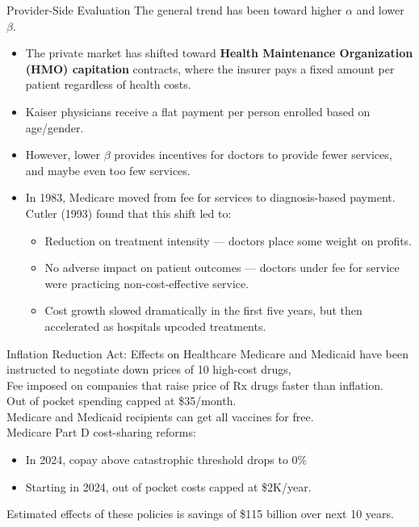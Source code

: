 \documentclass[10pt]{extarticle}
\begin{document}
\begin{problem}{Provider-Side Evaluation}
    The general trend has been toward higher $\alpha$ and lower $\beta$.
    \begin{itemize}
      \item The private market has shifted toward \textbf{Health Maintenance Organization (HMO) capitation} contracts, where the insurer pays a fixed amount per patient regardless of health costs.
      \item Kaiser physicians receive a flat payment per person enrolled based on age/gender.
      \item However, lower $\beta$ provides incentives for doctors to provide fewer services, and maybe even too few services.
      \item In 1983, Medicare moved from fee for services to diagnosis-based payment. Cutler (1993) found that this shift led to:
        \begin{itemize}
          \item Reduction on treatment intensity --- doctors place some weight on profits.
          \item No adverse impact on patient outcomes --- doctors under fee for service were practicing non-cost-effective service.
          \item Cost growth slowed dramatically in the first five years, but then accelerated as hospitals upcoded treatments.
        \end{itemize}
    \end{itemize}
  \end{problem}
  \begin{problem}{Inflation Reduction Act: Effects on Healthcare}
    Medicare and Medicaid have been instructed to negotiate down prices of 10 high-cost drugs,\\

    Fee imposed on companies that raise price of Rx drugs faster than inflation.\\

    Out of pocket spending capped at \$35/month.\\

    Medicare and Medicaid recipients can get all vaccines for free.\\

    Medicare Part D cost-sharing reforms:
    \begin{itemize}
      \item In 2024, copay above catastrophic threshold drops to 0\%
      \item Starting in 2024, out of pocket costs capped at \$2K/year.
    \end{itemize}
    Estimated effects of these policies is savings of \$115 billion over next 10 years.
  \end{problem}
\end{document}
